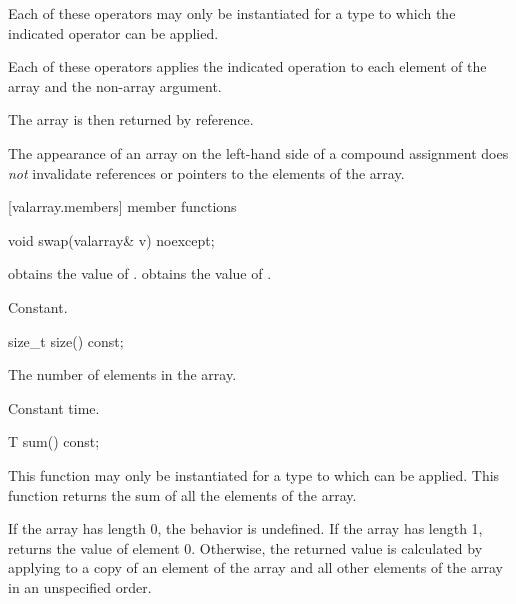 \begin{itemdescr}
\pnum
Each of these operators may only be instantiated for a type 
to which the indicated operator can be applied.

\pnum
Each of these operators applies the indicated operation to each element
of the array and the non-array argument.

\pnum
The array is then returned by reference.

\pnum
The appearance of an array on the left-hand side of a compound assignment
does
\textit{not}
invalidate references or pointers to the elements of the array.
\end{itemdescr}

[valarray.members]{ member functions}

%
\begin{itemdecl}
void swap(valarray& v) noexcept;
\end{itemdecl}

\begin{itemdescr}
\pnum
\effects {} obtains the value of
.  obtains the value of .

\pnum
\complexity Constant.
\end{itemdescr}

%
\begin{itemdecl}
size_t size() const;
\end{itemdecl}

\begin{itemdescr}
\pnum
\returns The number of elements in the array.

\pnum
\complexity Constant time.
\end{itemdescr}

%
\begin{itemdecl}
T sum() const;
\end{itemdecl}

\begin{itemdescr}
This function may only be instantiated for a type  to which
can be applied.
This function returns the sum of all the elements of the array.

\pnum
If the array has length 0, the behavior is undefined.%
If the array has length 1,
returns the value of element 0.
Otherwise, the returned value is calculated by applying
to a copy of an element of the array and
all other elements of the array in an unspecified order.%
\end{itemdescr}

